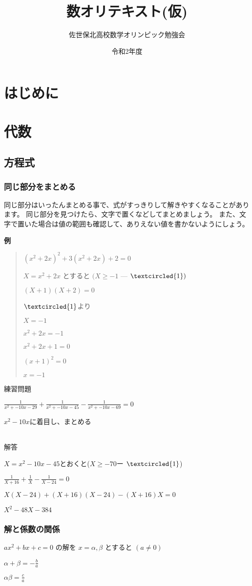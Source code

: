 \documentclass[dvipdfmx]{jsbook}
\begin{document}
\title{数オリテキスト(仮)}
\author{佐世保北高校数学オリンピック勉強会}
\date{令和2年度}
\maketitle

\part{はじめに}

\part{代数}
\chapter{方程式}
\section{同じ部分をまとめる}
同じ部分はいったんまとめる事で、式がすっきりして解きやすくなることがあります。
同じ部分を見つけたら、文字で置くなどしてまとめましょう。
また、文字で置いた場合は値の範囲も確認して、ありえない値を書かないようにしょう。

\vspace{15pt} {\large \textbf{例}}

\begin{quote}
    $(x^2+2x)^2+3(x^2+2x)+2=0$

    $X=x^2+2x$
    とすると
    $(X\geq-1$ –– $ \textcircled{\scriptsize1})$
    
    $(X+1)(X+2)=0$
    
    $ \textcircled{\scriptsize1} $より
    
    $X=-1$
    
    $x^2+2x=-1$
    
    $x^2+2x+1=0$
    
    $(x+1)^2=0$
    
    $x=-1$
\end{quote}

練習問題

$\frac{1}{x^2+-10x-29}+\frac{1}{x^2+-10x-45}-\frac{1}{x^2+-10x-69}=0$


$x^2-10x$に着目し、まとめる

\paragraph{}解答

$X=x^2-10x-45$とおくと($X\geq-70$ー $\textcircled{\scriptsize1}$)

$\frac{1}{X+16}+\frac{1}{X}-\frac{1}{X-24}=0$

$X(X-24)+(X+16)(X-24)-(X+16)X=0$

$X^2-48X-384$

\section{解と係数の関係}

$ax^2+bx+c=0$
の解を
$x=\alpha,\beta$
とすると
$(a\neq0)$

$\alpha+\beta=-\frac{b}{a}$

$\alpha\beta=\frac{c}{a}$
\end{document}
